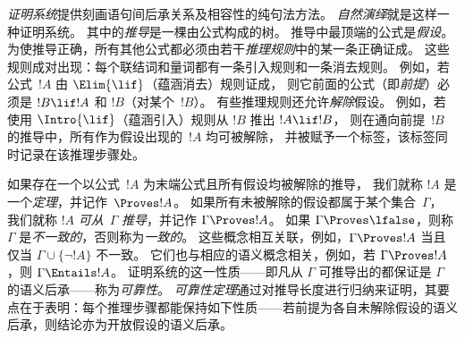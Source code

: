 \emph{证明系统}提供刻画语句间后承关系及相容性的纯句法方法。
\emph{自然演绎}就是这样一种证明系统。
其中的\emph{推导}是一棵由公式构成的树。
推导中最顶端的公式是\emph{假设}。
为使推导正确，所有其他公式都必须由若干\emph{推理规则}中的某一条正确证成。
这些规则成对出现：每个联结词和量词都有一条引入规则和一条消去规则。
例如，若公式~$!A$ 由 $\Elim{\lif}$（蕴涵消去）规则证成，
则它前面的公式（即\emph{前提}）必须是 $!B \lif !A$ 和 $!B$（对某个~$!B$）。
有些推理规则还允许\emph{解除}假设。
例如，若使用 $\Intro{\lif}$（蕴涵引入）规则从 $!B$ 推出 $!A \lif !B$，
则在通向前提~$!B$ 的推导中，所有作为假设出现的~$!A$ 均可被解除，
并被赋予一个标签，该标签同时记录在该推理步骤处。

如果存在一个以公式~$!A$ 为末端公式且所有假设均被解除的推导，
我们就称 $!A$ 是一个\emph{定理}，并记作~$\Proves !A$。
如果所有未被解除的假设都属于某个集合~$\Gamma$，
我们就称 $!A$ \emph{可从}~$\Gamma$ \emph{推导}，并记作 $\Gamma \Proves !A$。
如果 $\Gamma \Proves \lfalse$，则称 $\Gamma$ 是\emph{不一致的}，否则称为\emph{一致的}。
这些概念相互关联，例如，$\Gamma \Proves !A$ 当且仅当 $\Gamma \cup \{\lnot !A\}$ 不一致。
它们也与相应的语义概念相关，例如，若 $\Gamma \Proves !A$，则 $\Gamma \Entails !A$。
证明系统的这一性质——即凡从 $\Gamma$ 可推导出的都保证是 $\Gamma$ 的语义后承——称为\emph{可靠性}。
\emph{可靠性定理}通过对推导长度进行归纳来证明，其要点在于表明：每个推理步骤都能保持如下性质——若前提为各自未解除假设的语义后承，则结论亦为开放假设的语义后承。